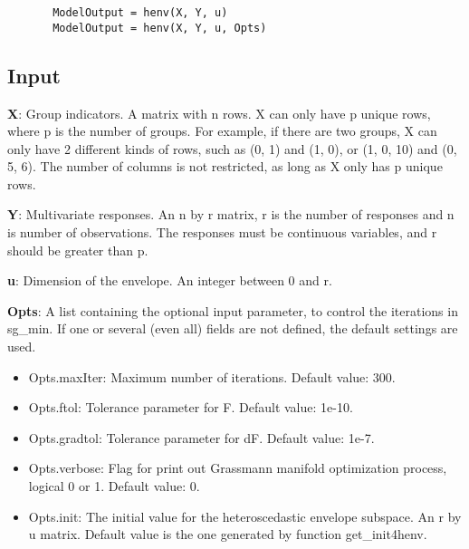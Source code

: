 \documentclass[a4paper,11pt,openany]{memoir}
\begin{document}
\begin{verbatim}       ModelOutput = henv(X, Y, u)
       ModelOutput = henv(X, Y, u, Opts)\end{verbatim}
    

\subsection*{Input}

\begin{par}
\textbf{X}: Group indicators. A matrix with n rows.  X can only have p unique  rows, where p is the number of groups. For example, if there are two groups, X can only have 2 different kinds of rows, such as (0, 1) and (1, 0), or (1, 0, 10) and (0, 5, 6).  The number of columns is not restricted, as long as X only has p unique rows.
\end{par} \vspace{1em}
\begin{par}
\textbf{Y}: Multivariate responses. An n by r matrix, r is the number of responses and n is number of observations. The responses must be continuous variables, and r should be greater than p.
\end{par} \vspace{1em}
\begin{par}
\textbf{u}: Dimension of the envelope. An integer between 0 and r.
\end{par} \vspace{1em}
\begin{par}
\textbf{Opts}: A list containing the optional input parameter, to control the iterations in sg\_min. If one or several (even all) fields are not defined, the default settings are used.
\end{par} \vspace{1em}
\begin{itemize}
\setlength{\itemsep}{-1ex}
   \item Opts.maxIter: Maximum number of iterations.  Default value: 300.
   \item Opts.ftol: Tolerance parameter for F.  Default value: 1e-10.
   \item Opts.gradtol: Tolerance parameter for dF.  Default value: 1e-7.
   \item Opts.verbose: Flag for print out Grassmann manifold optimization process, logical 0 or 1. Default value: 0.
   \item Opts.init: The initial value for the heteroscedastic envelope subspace. An r by u matrix. Default value is the one generated by function get\_init4henv.
\end{itemize}
\end{document}
